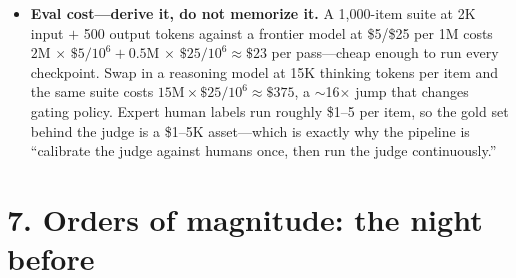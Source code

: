 \begin{itemize}[leftmargin=*,itemsep=1pt]
exist because verbosity alone moves leaderboards several points.
\item \textbf{Eval cost---derive it, do not memorize it.} A 1{,}000-item suite
at 2K input $+$ 500 output tokens against a frontier model at \$5/\$25 per 1M
costs $2\text{M}\,{\times}\,\$5/10^{6} + 0.5\text{M}\,{\times}\,\$25/10^{6}
\approx \$23$ per pass---cheap enough to run every checkpoint. Swap in a
reasoning model at 15K thinking tokens per item and the same suite costs
$15\text{M} \times \$25/10^{6} \approx \$375$, a $\sim$16$\times$ jump that
changes gating policy. Expert human labels run roughly \$1--5 per item, so the
gold set behind the judge is a \$1--5K asset---which is exactly why the pipeline
is ``calibrate the judge against humans once, then run the judge continuously.''
\end{itemize}

\section*{7. Orders of magnitude: the night before}

